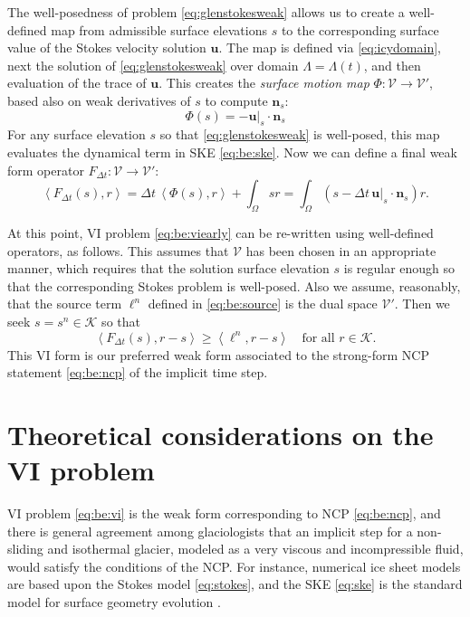 \documentclass[hidelinks,onefignum,onetabnum,final]{siamart220329}  %
\newcommand{\bn}{\mathbf{n}}
\newcommand{\bu}{\mathbf{u}}
\newcommand{\cK}{\mathcal{K}}
\newcommand{\cV}{\mathcal{V}}
\newcommand{\ip}[2]{\left<#1,#2\right>}
\begin{document}
The well-posedness of problem \eqref{eq:glenstokesweak} allows us to create a well-defined map from admissible surface elevations $s$ to the corresponding surface value of the Stokes velocity solution $\bu$.  The map is defined via \eqref{eq:icydomain}, next the solution of \eqref{eq:glenstokesweak} over domain $\Lambda=\Lambda(t)$, and then evaluation of the trace of $\bu$.  This creates the \emph{surface motion map} $\Phi:\cV \to \cV'$, based also on weak derivatives of $s$ to compute $\bn_s$:
\begin{equation}
\Phi(s) = - \bu|_s\cdot \bn_s \label{eq:be:Phidefine}
\end{equation}
For any surface elevation $s$ so that \eqref{eq:glenstokesweak} is well-posed, this map evaluates the dynamical term in SKE \eqref{eq:be:ske}.  Now we can define a final weak form operator $F_{\Delta t}:\cV\to\cV'$:
\begin{equation}
\ip{F_{\Delta t}(s)}{r} = \Delta t\,\ip{\Phi(s)}{r} + \int_\Omega s r = \int_\Omega \left(s - \Delta t\, \bu|_s \cdot \bn_s\right) r.  \label{eq:be:Fdefine}
\end{equation}

At this point, VI problem \eqref{eq:be:viearly} can be re-written using well-defined operators, as follows.  This assumes that $\cV$ has been chosen in an appropriate manner, which requires that the solution surface elevation $s$ is regular enough so that the corresponding Stokes problem is well-posed.  Also we assume, reasonably, that the source term $\ell^n$ defined in \eqref{eq:be:source} is the dual space $\cV'$.  Then we seek $s = s^n \in \cK$ so that
\begin{equation}
\ip{F_{\Delta t}(s)}{r-s} \ge \ip{\ell^n}{r-s} \quad \text{for all } r \in \cK. \label{eq:be:vi}
\end{equation}
This VI form is our preferred weak form associated to the strong-form NCP statement \eqref{eq:be:ncp} of the implicit time step.


\section{Theoretical considerations on the VI problem} \label{sec:theory}

VI problem \eqref{eq:be:vi} is the weak form corresponding to NCP \eqref{eq:be:ncp}, and there is general agreement among glaciologists that an implicit step for a non-sliding and isothermal glacier, modeled as a very viscous and incompressible fluid, would satisfy the conditions of the NCP.  For instance, numerical ice sheet models \cite{IsaacStadlerGhattas2015,WirbelJarosch2020} are based upon the Stokes model \eqref{eq:stokes}, and the SKE \eqref{eq:ske} is the standard model for surface geometry evolution \cite{GreveBlatter2009,SchoofHewitt2013}.
\end{document}
